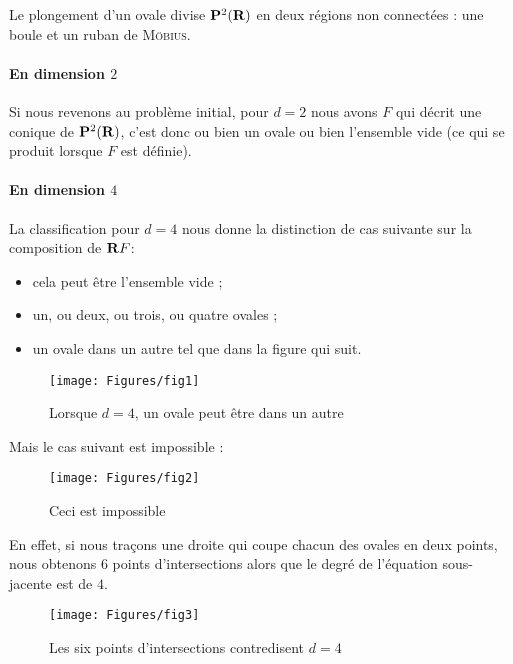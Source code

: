 \documentclass{livre}
\begin{document}
Le plongement d'un ovale divise $\mathbf{P}^{2}(\mathbf{R})$ en deux régions non connectées : une boule et un ruban de \textsc{Möbius}.

\paragraph{En dimension $2$}Si nous revenons au problème initial, pour $d=2$ nous avons $F$ qui décrit une conique de $\mathbf{P}^{2}(\mathbf{R})$, c'est donc ou bien un ovale ou bien l'ensemble vide (ce qui se produit lorsque $F$ est définie).


\paragraph{En dimension $4$}La classification pour $d=4$ nous donne la distinction de cas suivante sur la composition de $\mathbf{R} F$:
\begin{itemize}
\item cela peut être l'ensemble vide ;
\item un, ou deux, ou trois, ou quatre ovales ;
\item un ovale dans un autre tel que dans la figure qui suit.
\end{itemize}

\begin{figure}[H]
\begin{center}
\texttt{[image: Figures/fig1]}
\end{center}
\caption{Lorsque $d=4$, un ovale peut être dans un autre}\label{fig1}
\end{figure}

Mais le cas suivant est impossible :
\begin{figure}[H]
\begin{center}
\texttt{[image: Figures/fig2]}
\end{center}
\caption{Ceci est impossible}
\end{figure}
En effet, si nous traçons une droite qui coupe chacun des ovales en deux points, nous obtenons $6$ points d'intersections alors que le degré de l'équation sous-jacente est de $4$.
\begin{figure}[H]
\begin{center}
\texttt{[image: Figures/fig3]}
\end{center}
\caption{Les six points d'intersections contredisent $d=4$}
\end{figure}
\end{document}
